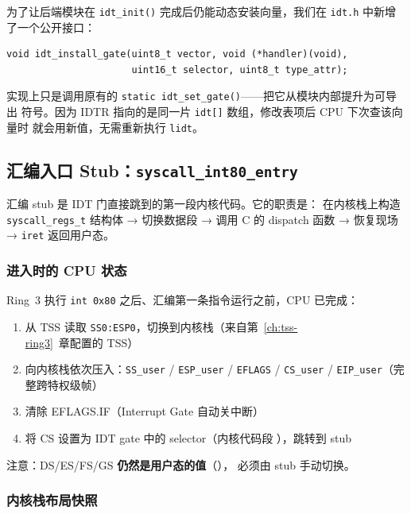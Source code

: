 为了让后端模块在 \texttt{idt\_init()} 完成后仍能动态安装向量，我们在
\texttt{idt.h} 中新增了一个公开接口：

\begin{lstlisting}[style=cstyle]
void idt_install_gate(uint8_t vector, void (*handler)(void),
                      uint16_t selector, uint8_t type_attr);
\end{lstlisting}

实现上只是调用原有的 \texttt{static idt\_set\_gate()}——把它从模块内部提升为可导出
符号。因为 IDTR 指向的是同一片 \texttt{idt[]} 数组，修改表项后 CPU 下次查该向量时
就会用新值，无需重新执行 \texttt{lidt}。

\subsection{汇编入口 Stub：\texttt{syscall\_int80\_entry}}
\label{sec:int80-asm-stub}

汇编 stub 是 IDT 门直接跳到的第一段内核代码。它的职责是：
在内核栈上构造 \texttt{syscall\_regs\_t} 结构体 → 切换数据段 → 调用 C 的
dispatch 函数 → 恢复现场 → \texttt{iret} 返回用户态。

\subsubsection{进入时的 CPU 状态}

Ring~3 执行 \texttt{int 0x80} 之后、汇编第一条指令运行之前，CPU 已完成：

\begin{enumerate}
  \item 从 TSS 读取 \texttt{SS0:ESP0}，切换到内核栈（来自第~\ref{ch:tss-ring3}~章配置的 TSS）
  \item 向内核栈依次压入：\texttt{SS\_user} / \texttt{ESP\_user} /
    \texttt{EFLAGS} / \texttt{CS\_user} / \texttt{EIP\_user}（完整跨特权级帧）
  \item 清除 EFLAGS.IF（Interrupt Gate 自动关中断）
  \item 将 CS 设置为 IDT gate 中的 selector（内核代码段 ），跳转到 stub
\end{enumerate}

\noindent 注意：DS/ES/FS/GS \textbf{仍然是用户态的值}（），
必须由 stub 手动切换。

\subsubsection{内核栈布局快照}

